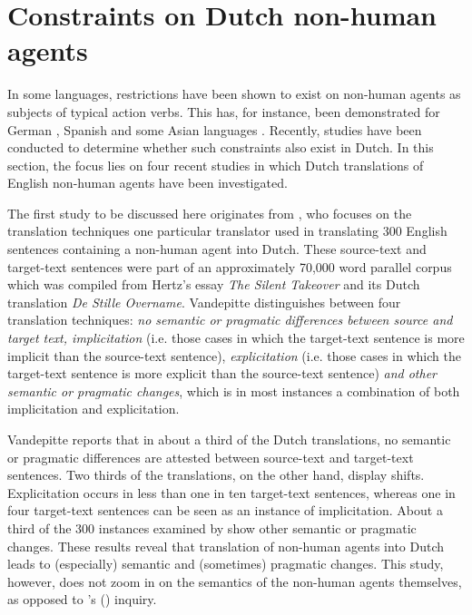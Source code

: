 \documentclass[output=paper]{LSP/langsci}
\begin{document}
\section{Constraints on Dutch non-human agents}
In some languages, restrictions have been shown to exist on non-human agents as subjects of typical action verbs. This has, for instance, been demonstrated for German \citep[see e.g.][]{Bahns1993}, Spanish \citep[see e.g.][]{Slabakova2002} and some Asian languages \citep[see e.g.][]{Master1991}. Recently, studies have been conducted to determine whether such constraints also exist in Dutch. In this section, the focus lies on four recent studies in which Dutch translations of English non-human agents have been investigated.

The first study to be discussed here originates from  \citet{Vandepitte2007}, who focuses on the translation techniques one particular translator used in translating 300 English sentences containing a non-human agent into Dutch. These source-text and target-text sentences were part of an approximately 70,000 word parallel corpus which was compiled from Hertz’s essay \textit{The Silent Takeover} and its Dutch translation \textit{De Stille Overname}. Vandepitte distinguishes between four translation techniques: \textit{no semantic or pragmatic differences between source and target text, implicitation} (i.e. those cases in which the target-text sentence is more implicit than the source-text sentence), \textit{explicitation} (i.e. those cases in which the target-text sentence is more explicit than the source-text sentence) \textit{and other semantic or pragmatic changes}, which is in most instances a combination of both implicitation and explicitation.

Vandepitte reports that in about a third of the Dutch translations, no semantic or pragmatic differences are attested between source-text and target-text sentences. Two thirds of the translations, on the other hand, display shifts. Explicitation occurs in less than one in ten target-text sentences, whereas one in four target-text sentences can be seen as an instance of implicitation. About a third of the 300 instances examined by \citet{Vandepitte2007} show other semantic or pragmatic changes. These results reveal that translation of non-human agents into Dutch leads to (especially) semantic and (sometimes) pragmatic changes. This study, however, does not zoom in on the semantics of the non-human agents themselves, as opposed to \citeauthor{Dhaeyere2010}'s (\citeyear{Dhaeyere2010}) inquiry. 
	
\end{document}
